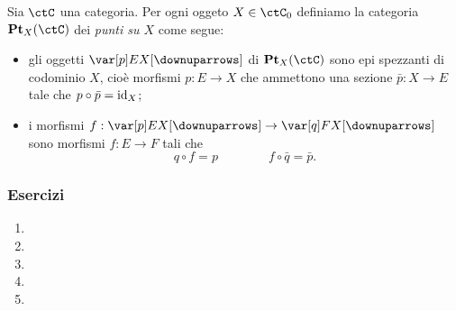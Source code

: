 \begin{example}\label{ex_cat_punti}
	Sia \(\ctC\) una categoria. Per ogni oggeto \(X\in\ctC_0\) definiamo la categoria \(\cate{Pt}_X(\ctC)\) dei \emph{punti su \(X\)} come segue:
	\begin{itemize}
		\item gli oggetti \(\var [p]EX[\downuparrows]\) di \(\cate{Pt}_X(\ctC)\) sono epi spezzanti di codominio \(X\), cioè morfismi \(p : E \to X\) che ammettono una sezione \(\bar p : X\to E\) tale che \(p\circ \bar p = \mathrm{id}_X\);
		\item i morfismi \(f : \var [p] EX[\downuparrows]\to \var[q] FX[\downuparrows]\) sono morfismi \(f : E \to F\) tali che
		      \[q\circ f = p \qquad \qquad f\circ \bar q = \bar p.\]
	\end{itemize}
\end{example}

\subsubsection*{Esercizi}
\begin{enumerate}
	\item
	\item
	\item
	\item
	\item
\end{enumerate}
